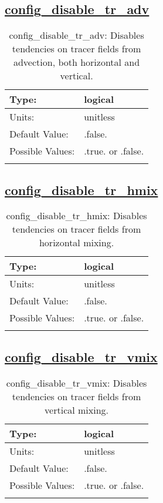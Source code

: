 \subsection[config\_disable\_tr\_adv]{\hyperref[sec:nm_tab_debug]{config\_disable\_tr\_adv}}
\label{subsec:nm_sec_config_disable_tr_adv}
\begin{center}
\begin{longtable}{| p{2.0in} || p{4.0in} |}
    \hline
    Type: & logical \\
    \hline
    Units: & \si{unitless} \\
    \hline
    Default Value: & .false. \\
    \hline
    Possible Values: & .true. or .false. \\
    \hline
    \caption{config\_disable\_tr\_adv: Disables tendencies on tracer fields from advection, both horizontal and vertical.}
\end{longtable}
\end{center}
\subsection[config\_disable\_tr\_hmix]{\hyperref[sec:nm_tab_debug]{config\_disable\_tr\_hmix}}
\label{subsec:nm_sec_config_disable_tr_hmix}
\begin{center}
\begin{longtable}{| p{2.0in} || p{4.0in} |}
    \hline
    Type: & logical \\
    \hline
    Units: & \si{unitless} \\
    \hline
    Default Value: & .false. \\
    \hline
    Possible Values: & .true. or .false. \\
    \hline
    \caption{config\_disable\_tr\_hmix: Disables tendencies on tracer fields from horizontal mixing.}
\end{longtable}
\end{center}
\subsection[config\_disable\_tr\_vmix]{\hyperref[sec:nm_tab_debug]{config\_disable\_tr\_vmix}}
\label{subsec:nm_sec_config_disable_tr_vmix}
\begin{center}
\begin{longtable}{| p{2.0in} || p{4.0in} |}
    \hline
    Type: & logical \\
    \hline
    Units: & \si{unitless} \\
    \hline
    Default Value: & .false. \\
    \hline
    Possible Values: & .true. or .false. \\
    \hline
    \caption{config\_disable\_tr\_vmix: Disables tendencies on tracer fields from vertical mixing.}
\end{longtable}
\end{center}
